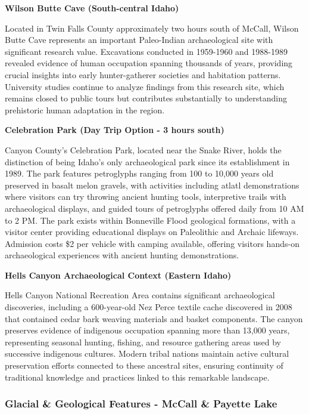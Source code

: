 \documentclass[
  11pt,
  letterpaper,
  DIV=10,
  numbers=noendperiod]{scrartcl}
\begin{document}
\textbf{Wilson Butte Cave (South-central Idaho)}

Located in Twin Falls County approximately two hours south of McCall,
Wilson Butte Cave represents an important Paleo-Indian archaeological
site with significant research value. Excavations conducted in 1959-1960
and 1988-1989 revealed evidence of human occupation spanning thousands
of years, providing crucial insights into early hunter-gatherer
societies and habitation patterns. University studies continue to
analyze findings from this research site, which remains closed to public
tours but contributes substantially to understanding prehistoric human
adaptation in the region.

\textbf{Celebration Park (Day Trip Option - 3 hours south)}

Canyon County's Celebration Park, located near the Snake River, holds
the distinction of being Idaho's only archaeological park since its
establishment in 1989. The park features petroglyphs ranging from 100 to
10,000 years old preserved in basalt melon gravels, with activities
including atlatl demonstrations where visitors can try throwing ancient
hunting tools, interpretive trails with archaeological displays, and
guided tours of petroglyphs offered daily from 10 AM to 2 PM. The park
exists within Bonneville Flood geological formations, with a visitor
center providing educational displays on Paleolithic and Archaic
lifeways. Admission costs \$2 per vehicle with camping available,
offering visitors hands-on archaeological experiences with ancient
hunting demonstrations.

\textbf{Hells Canyon Archaeological Context (Eastern Idaho)}

Hells Canyon National Recreation Area contains significant
archaeological discoveries, including a 600-year-old Nez Perce textile
cache discovered in 2008 that contained cedar bark weaving materials and
basket components. The canyon preserves evidence of indigenous
occupation spanning more than 13,000 years, representing seasonal
hunting, fishing, and resource gathering areas used by successive
indigenous cultures. Modern tribal nations maintain active cultural
preservation efforts connected to these ancestral sites, ensuring
continuity of traditional knowledge and practices linked to this
remarkable landscape.

\subsubsection{Glacial \& Geological Features - McCall \& Payette
Lake}\label{glacial-geological-features---mccall-payette-lake}
\end{document}
